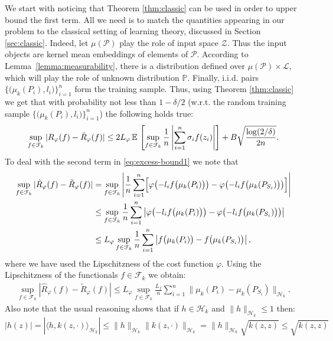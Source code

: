 \documentclass{article}
\DeclareMathOperator*{\E}{\mathbb{E}\,}
\renewcommand{\P}{\mathcal{P}}
\renewcommand{\H}{\mathcal{H}}
\newcommand{\F}{\mathcal{F}}
\newcommand{\Z}{\mathcal{Z}}
\newcommand{\Pio}{\mathbb{P}}
\renewcommand{\L}{\mathcal{L}}
\newcommand{\Rp}{R_{\varphi}}
\newcommand{\Rpn}{\hat{R}_{\varphi}}
\newcommand{\Rpnt}{\tilde{R}_{\varphi}}
\begin{document}
We start with noticing that Theorem \ref{thm:classic} can be used in order to
upper bound the first term.  All we need is to match the quantities appearing
in our problem to the classical setting of learning theory, discussed in
Section \ref{sec:classic}.  Indeed, let $\mu(\P)$ play the role of input space
$\Z$.  Thus the input objects are kernel mean embeddings of elements of $\P$.
According to Lemma~\ref{lemma:measurability}, there is a distribution defined
over $\mu(\P)\times\L$, which will play the role of unknown distribution
$\Pio$.  Finally, i.i.d. pairs
$\bigl\{\bigl(\mu_k(P_i),l_i\bigr)\bigr\}_{i=1}^n$ form the training sample.
Thus, using Theorem \ref{thm:classic} we get that with probability not less
than $1-\delta/2$ (w.r.t. the random training sample
$\bigl\{\bigl(\mu_k(P_i),l_i\bigr)\bigr\}_{i=1}^n$) the following holds true:
\begin{equation}
\label{eq:excess-bound2}
\sup_{f\in\F_k}|\Rp(f) - \Rpn(f)|\\
\leq
2 L_\varphi \E\left[\sup_{f\in \F_k}\frac{1}{n}\left|\sum_{i=1}^n \sigma_i f(z_i)\right|\right] + B\sqrt{\frac{\log(2/\delta)}{2n}}.
\end{equation}
To deal with the second term in \eqref{eq:excess-bound1} we note that
\begin{align*}
\notag
\sup_{f\in \F_k}|\Rpn(f) - \Rpnt(f)| 
&=
\sup_{f\in \F_k}\left|
\frac{1}{n}
\sum_{i=1}^n\Bigl[\varphi\bigl(-l_if\bigl(\mu_k(P_i)\bigr)\bigr) - \varphi\bigl(-l_i f\bigl(\mu_k(P_{S_i})\bigr)\bigr)\Bigr]
\right| \\
\notag
&\leq
\sup_{f\in \F_k}
\frac{1}{n}
\sum_{i=1}^n
\left|
\varphi\bigl(-l_if\bigl(\mu_k(P_i)\bigr)\bigr) - \varphi\bigl(-l_i f\bigl(\mu_k(P_{S_i})\bigr)\bigr)
\right| \\
\notag
&\leq
L_\varphi\sup_{f\in \F_k}
\frac{1}{n}
\sum_{i=1}^n
\left|
f\bigl(\mu_k(P_i)\bigr) - f\bigl(\mu_k(P_{S_i})\bigr)
\right|,
\end{align*}
where we have used the Lipschitzness of the cost function $\varphi$.
Using the Lipschitzness of the functionals $f\in\F_k$ we obtain:
\begin{align}
\label{eq:sec3-proof-1}
\sup_{f\in \F_k}|\Rpn(f) - \Rpnt(f)| \leq
L_\varphi\sup_{f\in \F_k}
\frac{L_f}{n}
\sum_{i=1}^n
\|
\mu_k(P_i) - \mu_k(P_{S_i})
\|_{\H_k}.
\end{align}
Also note that the usual reasoning shows that if $h\in\H_k$ and
$\|h\|_{\H_k}\leq 1$ then: 
\[
|h(z)|=|\langle h, k(z,\cdot) \rangle_{\H_k}| \leq \|h\|_{\H_k} \|k(z,\cdot)\|_{\H_k} = \|h\|_{\H_k} \sqrt{k(z,z)}\leq \sqrt{k(z,z)}
\]
\end{document}
